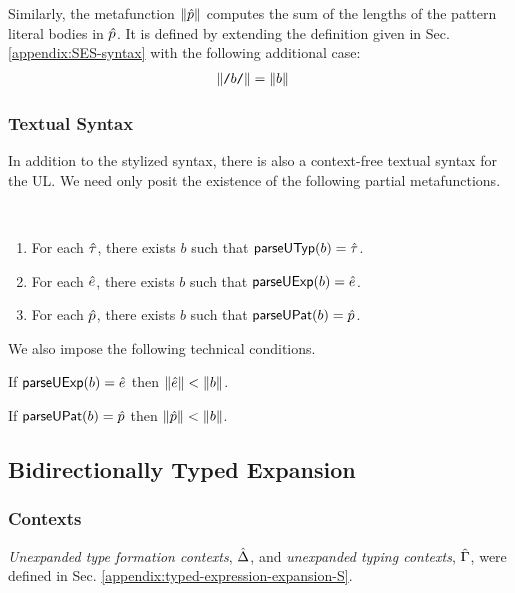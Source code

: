 Similarly, the metafunction $\Vert \hat{p} \Vert$ computes the sum of the lengths of the pattern literal bodies in $\hat{p}$. It is defined by extending the definition given in Sec. \ref{appendix:SES-syntax} with the following additional case:
\begin{align*}
\Vert {\texttt{/}b\texttt{/}} \Vert & = \Vert b \Vert
\end{align*}

\subsubsection{Textual Syntax}
In addition to the stylized syntax, there is also a context-free textual syntax for the UL. We need only posit the existence of the following partial metafunctions.

\begin{condition}\label{condition:textual-representability-BS} ~
\begin{enumerate}
\item For each ${\hat\tau}$, there exists $b$ such that $\mathsf{parseUTyp}(b)={\hat\tau}$. 
\item For each ${\hat e}$, there exists $b$ such that $\mathsf{parseUExp}(b)={\hat e}$.
\item {For each $\hat{p}$, there exists $b$ such that $\mathsf{parseUPat}(b)=\hat{p}$.}
\end{enumerate}
\end{condition}

We also impose the following technical conditions.

\begin{condition}\label{condition:body-parsing-BS} If $\mathsf{parseUExp}(b)={\hat e}$ then $\Vert {\hat e} \Vert < \Vert b \Vert$.\end{condition}

\begin{condition}\label{condition:pattern-parsing-BS} If $\mathsf{parseUPat}(b)=\hat{p}$ then $\Vert \hat{p} \Vert < \Vert b \Vert$.\end{condition}

\subsection{Bidirectionally Typed Expansion}
\subsubsection{Contexts}
\emph{Unexpanded type formation contexts}, $\hat{\Delta}$, and \emph{unexpanded typing contexts}, $\hat{\Gamma}$, were defined in Sec. \ref{appendix:typed-expression-expansion-S}.

